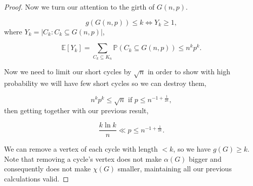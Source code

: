 \documentclass[12pt,twoside,a4paper,bibliography=totocnumbered]{book}
\numberwithin{equation}{section}
\let\log=\ln
\theoremstyle{remark}
\begin{document}
\begin{proof}
Now we turn our attention to the girth of $G(n,p)$.

$$ g(G(n,p)) \leq k \iff Y_k \geq 1,$$
where $Y_k = |C_k \colon C_k \subseteq G(n,p)|$,

$$\mathbb{E}[Y_k] = \sum_{C_k \subseteq K_n} \mathbb{P}(C_k \subseteq G(n,p) ) \leq n^kp^k.$$

Now we need to limit our short cycles by $\sqrt{n}$ in order to show with high probability we will have few short cycles so we can destroy them,

$$n^kp^k \leq \sqrt{n} \text{ if } p \leq n^{-1 + \frac{1}{2k}},$$
then getting together with our previous result,

$$\frac{k\log k}{n} \ll p \leq n^{-1 + \frac{1}{2k}}.$$

We can remove a vertex of each cycle with length $<k$, so we have $g(G) \geq k$. Note that removing a cycle's vertex does not make $\alpha(G)$ bigger and consequently does not make $\chi(G)$ smaller, maintaining all our previous calculations valid.
\end{proof}
\end{document}
